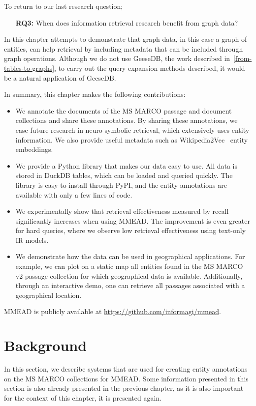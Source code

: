 To return to our last research question; 
\begin{itemize}
	\item[\textbf{RQ3:}] When does information retrieval research benefit from graph data?
\end{itemize}   
In this chapter attempts to demonstrate that graph data, in this case a graph of entities, can help retrieval by including metadata that can be included through graph operations. Although we do not use GeeseDB, the work described in~\cref{from-tables-to-graphs}, to carry out the query expansion methods described, it would be a natural application of GeeseDB. %

In summary, this chapter makes the following contributions:
 \begin{itemize}
	\item We annotate the documents of the MS MARCO passage and document collections and share these annotations. By sharing these annotations, we ease future research in neuro-symbolic retrieval, which extensively uses entity information. We also provide useful metadata such as Wikipedia2Vec~\citep{wikipedia2vec} entity embeddings. 
	\item We provide a Python library that makes our data easy to use. All data is stored in DuckDB tables, which can be loaded and queried quickly. The library is easy to install through PyPI, and the entity annotations are available with only a few lines of code.
	\item We experimentally show that retrieval effectiveness measured by recall significantly increases when using MMEAD. The improvement is even greater for hard queries, where we observe low retrieval effectiveness using text-only IR models.
	\item We demonstrate how the data can be used in geographical applications. For example, we can plot on a static map all entities found in the MS MARCO v2 passage collection for which geographical data is available. Additionally, through an interactive demo, one can retrieve all passages associated with a geographical location.  
\end{itemize}

MMEAD is publicly available at \url{https://github.com/informagi/mmead}.

\section{Background}
In this section, we describe systems that are used for creating entity annotations on the MS MARCO collections for MMEAD. Some information presented in this section is also already presented in the previous chapter, as it is also important for the context of this chapter, it is presented again. 

